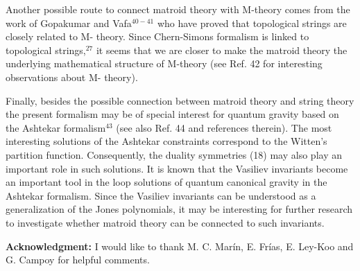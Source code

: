 \documentclass[a4paper,12pt]{article}
\begin{document}
Another possible route to connect matroid theory with M-theory comes from
the work of Gopakumar and Vafa$^{40-41}$ who have proved that topological
strings are closely related to M- theory. Since Chern-Simons formalism is
linked to topological strings,$^{27}$ it seems that we are closer to make
the matroid theory the underlying mathematical structure of M-theory (see
Ref. 42 for interesting observations about M- theory).

Finally, besides the possible connection between matroid theory and string
theory the present formalism may be of special interest for quantum gravity
based on the Ashtekar formalism$^{43}$ (see also Ref. 44 and references
therein). The most interesting solutions of the Ashtekar constraints
correspond to the Witten's partition function. Consequently, the duality
symmetries (18) may also play an important role in such solutions. It is
known that the Vasiliev invariants become an important tool in the loop
solutions of quantum canonical gravity in the Ashtekar formalism. Since the
Vasiliev invariants can be understood as a generalization of the Jones
polynomials, it may be interesting for further research to investigate
whether matroid theory can be connected to such invariants.

\bigskip

\noindent \textbf{Acknowledgment:} I would like to thank M. C. Mar\'{i}n, E.
Fr\'{i}as, E. Ley-Koo and G. Campoy for helpful comments.

\bigskip
\end{document}
